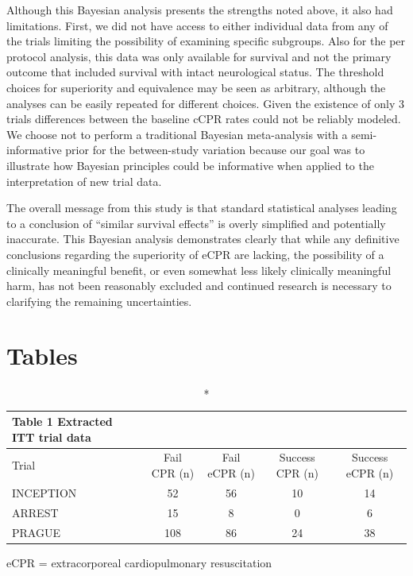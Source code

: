 \documentclass[
  super,
  preprint,
  3p]{elsarticle}
\begin{document}
Although this Bayesian analysis presents the strengths noted above, it
also had limitations. First, we did not have access to either individual
data from any of the trials limiting the possibility of examining
specific subgroups. Also for the per protocol analysis, this data was
only available for survival and not the primary outcome that included
survival with intact neurological status. The threshold choices for
superiority and equivalence may be seen as arbitrary, although the
analyses can be easily repeated for different choices. Given the
existence of only 3 trials differences between the baseline cCPR rates
could not be reliably modeled. We choose not to perform a traditional
Bayesian meta-analysis with a semi-informative prior for the
between-study variation because our goal was to illustrate how Bayesian
principles could be informative when applied to the interpretation of
new trial data.

The overall message from this study is that standard statistical
analyses leading to a conclusion of ``similar survival effects'' is
overly simplified and potentially inaccurate. This Bayesian analysis
demonstrates clearly that while any definitive conclusions regarding the
superiority of eCPR are lacking, the possibility of a clinically
meaningful benefit, or even somewhat less likely clinically meaningful
harm, has not been reasonably excluded and continued research is
necessary to clarifying the remaining uncertainties.

\newpage

\hypertarget{tables}{%
\section{Tables}\label{tables}}

\setlength{\LTpost}{0mm}
\begin{longtable}{lcccc}
\caption*{
{\large Table 1 Extracted ITT trial data}
} \\ 
\toprule
Trial & Fail CPR (n) & Fail eCPR (n) & Success CPR (n) & Success eCPR (n) \\ 
\midrule
INCEPTION & 52 & 56 & 10 & 14 \\ 
ARREST & 15 & 8 & 0 & 6 \\ 
PRAGUE & 108 & 86 & 24 & 38 \\ 
\bottomrule
\end{longtable}
\begin{minipage}{\linewidth}
eCPR = extracorporeal cardiopulmonary resuscitation\\
\end{minipage}
\end{document}
